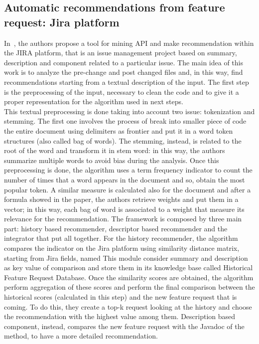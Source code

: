 \subsection{Automatic recommendations from feature request: Jira platform}
In~\cite{thung_automatic_2013}, the authors propose a tool for mining API and make recommendation within the JIRA platform, that is an issue management project based on summary, description and component related to a particular issue. The main idea of this work is to analyze the pre-change and post changed files and, in this way, find recommendations starting from a textual description of the input. The first step is the preprocessing of the input, necessary to clean the code and to give it a proper representation for the algorithm used in next steps. \\
This textual preprocessing is done taking into account two issue: tokenization and stemming. The first one involves the process of break into smaller piece of code the entire document using delimiters as frontier and put it in a word token structures (also called bag of words). The stemming, instead, is related to the root of the word and transform it in stem word: in this way, the authors summarize multiple words to avoid bias during the analysis. Once this preprocessing is done, the algorithm uses a term frequency indicator to count the number of times that a word appears in the document and so, obtain the most popular token. A similar measure is calculated also for the document and after a formula showed in the paper, the authors retrieve weights and put them in a vector; in this way, each bag of word is associated to a weight that measure its relevance for the recommendation. \newline
The framework is composed by three main part: history based recommender, descriptor based recommender and the integrator that put all together. For the history recommender, the algorithm compares the indicator on the Jira platform using similarity distance matrix, starting from Jira fields, named This module consider summary and description as key value of comparison and store them in its knowledge base called Historical Feature Request Database. Once the similarity scores are obtained, the algorithm perform aggregation of these scores and perform the final comparison between the historical scores (calculated in this step) and the new feature request that is coming. To do this, they create a top-k request looking at the history and choose the recommendation with the highest value among them. Description based component, instead, compares the new feature request with the Javadoc of the method, to have a more detailed recommendation. \\
